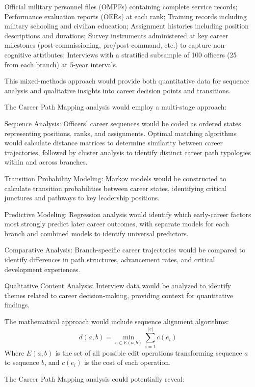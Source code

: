 \documentclass[../main.tex]{subfiles}
\begin{document}
Official military personnel files (OMPFs) containing complete service records; Performance evaluation reports (OERs) at each rank; Training records including military schooling and civilian education; Assignment histories including position descriptions and durations; Survey instruments administered at key career milestones (post-commissioning, pre/post-command, etc.) to capture non-cognitive attributes; Interviews with a stratified subsample of 100 officers (25 from each branch) at 5-year intervals.

This mixed-methods approach would provide both quantitative data for sequence analysis and qualitative insights into career decision points and transitions.

The Career Path Mapping analysis would employ a multi-stage approach:

Sequence Analysis: Officers' career sequences would be coded as ordered states representing positions, ranks, and assignments. Optimal matching algorithms would calculate distance matrices to determine similarity between career trajectories, followed by cluster analysis to identify distinct career path typologies within and across branches.

Transition Probability Modeling: Markov models would be constructed to calculate transition probabilities between career states, identifying critical junctures and pathways to key leadership positions.

Predictive Modeling: Regression analysis would identify which early-career factors most strongly predict later career outcomes, with separate models for each branch and combined models to identify universal predictors.

Comparative Analysis: Branch-specific career trajectories would be compared to identify differences in path structures, advancement rates, and critical development experiences.

Qualitative Content Analysis: Interview data would be analyzed to identify themes related to career decision-making, providing context for quantitative findings.

The mathematical approach would include sequence alignment algorithms:
\[
d(a,b) = \min_{e \in E(a,b)} \sum_{i=1}^{|e|} c(e_i)
\]
Where \(E(a,b)\) is the set of all possible edit operations transforming sequence \(a\) to sequence \(b\), and \(c(e_i)\) is the cost of each operation.

The Career Path Mapping analysis could potentially reveal:
\end{document}
